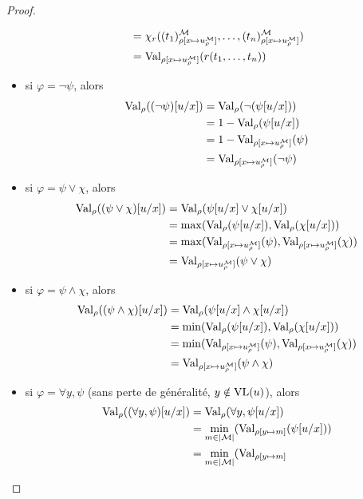 \begin{proof}
\begin{itemize}
\begin{align*}
      &= \chi_r((t_1)^\mathcal M_{\rho[x\mapsto u^\mathcal M_\rho]},\ldots,
      (t_n)^\mathcal M_{\rho[x\mapsto u^\mathcal M_\rho]})\\
      &= \operatorname{Val}_{\rho[x\mapsto u^\mathcal M_\rho]}(r(t_1,\ldots,t_n))
    \end{align*}
  \item si $\varphi = \lnot \psi$, alors
    \begin{align*}
      \operatorname{Val}_\rho((\lnot \psi)[u/x]) &= \operatorname{Val}_\rho(\lnot (\psi[u/x]))\\
      &= 1 - \operatorname{Val}_\rho(\psi[u/x])\\
      &= 1 - \operatorname{Val}_{\rho[x\mapsto u^\mathcal M_\rho]}(\psi)\\
      &= \operatorname{Val}_{\rho[x\mapsto u^\mathcal M_\rho]}(\lnot\psi)\\
    \end{align*}
  \item si $\varphi = \psi \lor \chi$, alors
    \begin{align*}
      \operatorname{Val}_\rho((\psi \lor \chi)[u/x]) &= \operatorname{Val}_\rho(\psi[u/x] \lor \chi[u/x])\\
      &= \max (\operatorname{Val}_\rho(\psi[u/x]),\operatorname{Val}_\rho(\chi[u/x]))\\
      &= \max (\operatorname{Val}_{\rho[x\mapsto u^\mathcal M_\rho]}(\psi),
      \operatorname{Val}_{\rho[x \mapsto u^\mathcal M_\rho]}(\chi))\\
      &= \operatorname{Val}_{\rho[x\mapsto u^\mathcal M_\rho]}(\psi\lor \chi)
    \end{align*}
  \item si $\varphi = \psi \land \chi$, alors
    \begin{align*}
      \operatorname{Val}_\rho((\psi \land \chi)[u/x]) &= \operatorname{Val}_\rho(\psi[u/x] \land \chi[u/x])\\
      &= \min (\operatorname{Val}_\rho(\psi[u/x]),\operatorname{Val}_\rho(\chi[u/x]))\\
      &= \min (\operatorname{Val}_{\rho[x\mapsto u^\mathcal M_\rho]}(\psi),
      \operatorname{Val}_{\rho[x \mapsto u^\mathcal M_\rho]}(\chi))\\
      &= \operatorname{Val}_{\rho[x\mapsto u^\mathcal M_\rho]}(\psi\land \chi)
    \end{align*}
  \item si $\varphi = \forall y, \psi$ (sans perte de généralité,
    $y\notin \operatorname{VL}(u)$), alors
    \begin{align*}
      \operatorname{Val}_\rho((\forall y,\psi)[u/x]) &= \operatorname{Val}_\rho(\forall y,\psi[u/x])\\
      &= \min_{m\in|\mathcal M|}(\operatorname{Val}_{\rho[y \mapsto m]}(\psi[u/x]))\\
      &= \min_{m\in|\mathcal M|}(\operatorname{Val}_{\rho[y\mapsto m]
}
\end{align*}
\end{itemize}
\end{proof}

